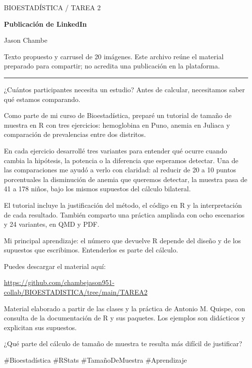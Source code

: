 \documentclass[11pt,a4paper]{article}
\begin{document}
{\small\color{Blue}BIOESTADÍSTICA / TAREA 2}\par
{\LARGE\bfseries\color{Navy}Publicación de LinkedIn}\par
{\large Jason Chambe}\par
{\small Texto propuesto y carrusel de 20 imágenes. Este archivo reúne el material preparado para compartir; no acredita una publicación en la plataforma.}\par
\vspace{4mm}\hrule\vspace{4mm}
¿Cuántos participantes necesita un estudio? Antes de calcular, necesitamos saber qué estamos comparando.

Como parte de mi curso de Bioestadística, preparé un tutorial de tamaño de muestra en R con tres ejercicios: hemoglobina en Puno, anemia en Juliaca y comparación de prevalencias entre dos distritos.

En cada ejercicio desarrollé tres variantes para entender qué ocurre cuando cambia la hipótesis, la potencia o la diferencia que esperamos detectar. Una de las comparaciones me ayudó a verlo con claridad: al reducir de 20 a 10 puntos porcentuales la disminución de anemia que queremos detectar, la muestra pasa de 41 a 178 niños, bajo los mismos supuestos del cálculo bilateral.

El tutorial incluye la justificación del método, el código en R y la interpretación de cada resultado. También comparto una práctica ampliada con ocho escenarios y 24 variantes, en QMD y PDF.

Mi principal aprendizaje: el número que devuelve R depende del diseño y de los supuestos que escribimos. Entenderlos es parte del cálculo.

Puedes descargar el material aquí:\par\url{https://github.com/chambejason951-collab/BIOESTADISTICA/tree/main/TAREA2}

Material elaborado a partir de las clases y la práctica de Antonio M. Quispe, con consulta de la documentación de R y sus paquetes. Los ejemplos son didácticos y explicitan sus supuestos.

¿Qué parte del cálculo de tamaño de muestra te resulta más difícil de justificar?

\#Bioestadística \#RStats \#TamañoDeMuestra \#Aprendizaje
\clearpage

\end{document}
